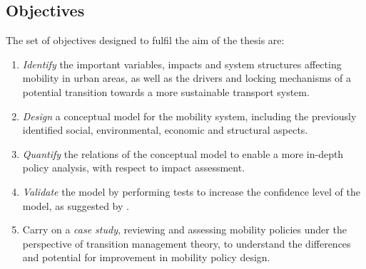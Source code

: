 \begin{multicols}{2}
\subsection*{Objectives}
The set of objectives designed to fulfil the aim of the thesis are:
\begin{enumerate}[label=(\alph*)]
	\item \textit{Identify} the important variables, impacts and system structures affecting mobility in urban areas, as well as the drivers and locking mechanisms of a potential transition towards a more sustainable transport system.
	\item \textit{Design} a conceptual model for the mobility system, including the previously identified social, environmental, economic and structural aspects.
	\item \textit{Quantify} the relations of the conceptual model to enable a more in-depth policy analysis, with respect to impact assessment.
	\item \textit{Validate} the model by performing tests to increase the confidence level of the model, as suggested by \textcite{forrester1978_TestsBuildingConfidence,qudrat-ullah2010_Howdostructural}.
	\item Carry on a \textit{case study}, reviewing and assessing mobility policies under the perspective of transition management theory, to understand the differences and potential for improvement in mobility policy design.
\end{enumerate}


\end{multicols}
